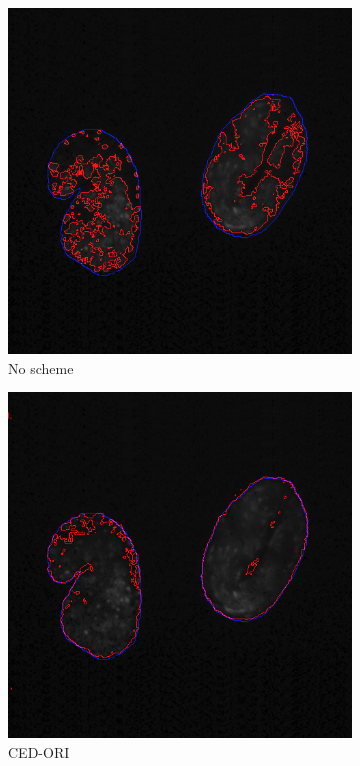 \documentclass[a4paper,11pt]{ijamas}
\begin{document}
{\begin{figure}
\begin{subfigure}{.25\textwidth}
  \centering
  \includegraphics[width=0.80\columnwidth]{./figs/results/3no.jpg}
 \caption{No scheme}
  \label{fig:noseg_3}
\end{subfigure}%
\begin{subfigure}{.25\textwidth}
  \centering
  \includegraphics[width=0.80\columnwidth]{./figs/results/3ced.jpg}
 \caption{CED-ORI}
  \label{fig:cedseg_3}
\end{subfigure}%
\begin{subfigure}{.25\textwidth}
  \centering

\end{subfigure}
\end{figure}}
\end{document}
